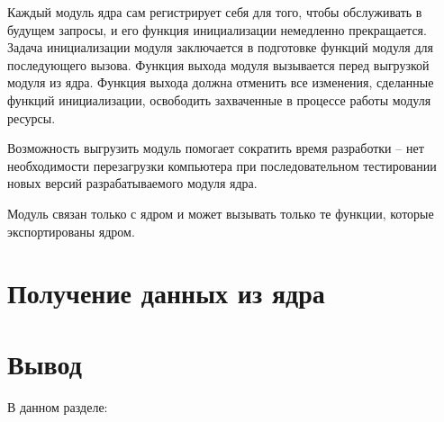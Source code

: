 Каждый модуль ядра сам регистрирует себя для того, чтобы обслуживать в будущем запросы, и его функция инициализации немедленно прекращается. Задача инициализации модуля заключается в подготовке функций модуля для последующего вызова. Функция выхода модуля вызывается перед выгрузкой модуля из ядра. Функция выхода должна отменить все изменения, сделанные функций инициализации, освободить захваченные в процессе работы модуля ресурсы. 

Возможность выгрузить модуль помогает сократить время разработки -- нет необходимости перезагрузки компьютера при последовательном тестировании новых версий разрабатываемого модуля ядра.

Модуль связан только с ядром и может вызывать только те функции, которые экспортированы ядром.

\section{Получение данных из ядра}

\section*{Вывод}



В данном разделе:


